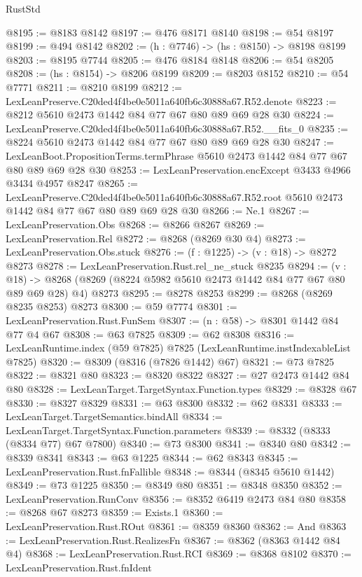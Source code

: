 \begin{lexlean}{RustStd}
\begin{coremodule}
@8195 := @8183 @8142
@8197 := @476 @8171 @8140
@8198 := @54 @8197
@8199 := @494 @8142
@8202 := (h : @7746) -> (hs : @8150) -> @8198 @8199
@8203 := @8195 @7744
@8205 := @476 @8184 @8148
@8206 := @54 @8205
@8208 := (hs : @8154) -> @8206 @8199
@8209 := @8203 @8152
@8210 := @54 @7771
@8211 := @8210 @8199
@8212 := LexLeanPreserve.C20ded4f4be0e5011a640fb6c30888a67.R52.denote
@8223 := @8212 @5610 @2473 @1442 @84 @77 @67 @80 @89 @69 @28 @30
@8224 := LexLeanPreserve.C20ded4f4be0e5011a640fb6c30888a67.R52.__fits_0
@8235 := @8224 @5610 @2473 @1442 @84 @77 @67 @80 @89 @69 @28 @30
@8247 := LexLeanBoot.PropositionTerms.termPhrase @5610 @2473 @1442 @84 @77 @67 @80 @89 @69 @28 @30
@8253 := LexLeanPreservation.encExcept @3433 @4966 @3434 @4957 @8247
@8265 := LexLeanPreserve.C20ded4f4be0e5011a640fb6c30888a67.R52.root
    @5610
    @2473
    @1442
    @84
    @77
    @67
    @80
    @89
    @69
    @28
    @30
@8266 := Ne.{1}
@8267 := LexLeanPreservation.Obs
@8268 := @8266 @8267
@8269 := LexLeanPreservation.Rel
@8272 := @8268 (@8269 @30 @4)
@8273 := LexLeanPreservation.Obs.stuck
@8276 := (f : @1225) -> (v : @18) -> @8272 @8273
@8278 := LexLeanPreservation.Rust.rel_ne_stuck @8235
@8294 := (v : @18) ->
  @8268 (@8269 (@8224 @5982 @5610 @2473 @1442 @84 @77 @67 @80 @89 @69 @28) @4) @8273
@8295 := @8278 @8253
@8299 := @8268 (@8269 @8235 @8253) @8273
@8300 := @59 @7774
@8301 := LexLeanPreservation.Rust.FunSem
@8307 := (n : @58) -> @8301 @1442 @84 @77 @4 @67
@8308 := @63 @7825
@8309 := @62 @8308
@8316 := LexLeanRuntime.index (@59 @7825) @7825 (LexLeanRuntime.instIndexableList @7825)
@8320 := @8309 (@8316 (@7826 @1442) @67)
@8321 := @73 @7825
@8322 := @8321 @80
@8323 := @8320 @8322
@8327 := @27 @2473 @1442 @84 @80
@8328 := LexLeanTarget.TargetSyntax.Function.types
@8329 := @8328 @67
@8330 := @8327 @8329
@8331 := @63 @8300
@8332 := @62 @8331
@8333 := LexLeanTarget.TargetSemantics.bindAll
@8334 := LexLeanTarget.TargetSyntax.Function.parameters
@8339 := @8332 (@8333 (@8334 @77) @67 @7800)
@8340 := @73 @8300
@8341 := @8340 @80
@8342 := @8339 @8341
@8343 := @63 @1225
@8344 := @62 @8343
@8345 := LexLeanPreservation.Rust.fnFallible
@8348 := @8344 (@8345 @5610 @1442)
@8349 := @73 @1225
@8350 := @8349 @80
@8351 := @8348 @8350
@8352 := LexLeanPreservation.RunConv
@8356 := @8352 @6419 @2473 @84 @80
@8358 := @8268 @67 @8273
@8359 := Exists.{1}
@8360 := LexLeanPreservation.Rust.ROut
@8361 := @8359 @8360
@8362 := And
@8363 := LexLeanPreservation.Rust.RealizesFn
@8367 := @8362 (@8363 @1442 @84 @4)
@8368 := LexLeanPreservation.Rust.RCI
@8369 := @8368 @8102
@8370 := LexLeanPreservation.Rust.fnIdent

\end{coremodule}
\end{lexlean}
